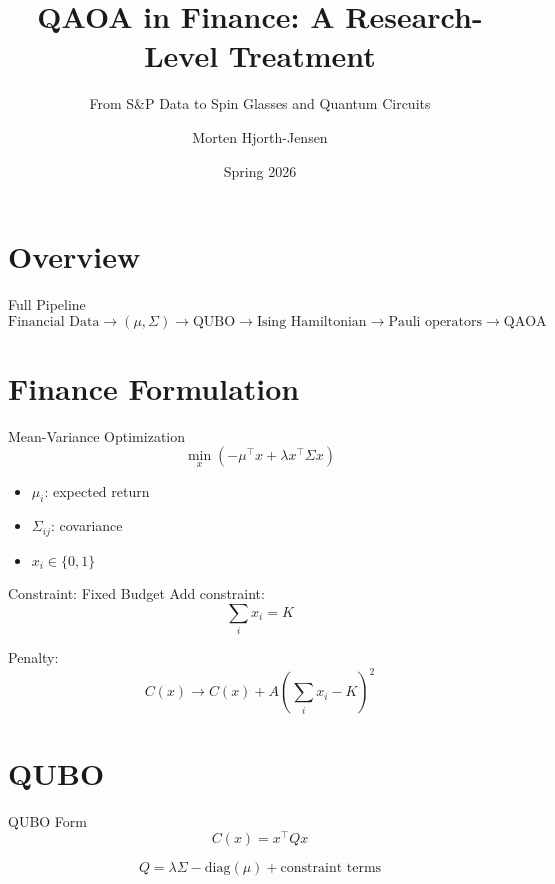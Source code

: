 \documentclass[aspectratio=169]{beamer}
\title{QAOA in Finance: A Research-Level Treatment}
\subtitle{From S\&P Data to Spin Glasses and Quantum Circuits}
\author{Morten Hjorth-Jensen}
\date{Spring 2026}
\begin{document}
\frame{\titlepage}

\section{Overview}

\begin{frame}{Full Pipeline}
\[
\text{Financial Data}
\rightarrow (\mu,\Sigma)
\rightarrow \text{QUBO}
\rightarrow \text{Ising Hamiltonian}
\rightarrow \text{Pauli operators}
\rightarrow \text{QAOA}
\]
\end{frame}

\section{Finance Formulation}

\begin{frame}{Mean-Variance Optimization}
\[
\min_x \left( -\mu^\top x + \lambda x^\top \Sigma x \right)
\]

\begin{itemize}
\item $\mu_i$: expected return
\item $\Sigma_{ij}$: covariance
\item $x_i \in \{0,1\}$
\end{itemize}
\end{frame}

\begin{frame}{Constraint: Fixed Budget}
Add constraint:
\[
\sum_i x_i = K
\]

Penalty:
\[
C(x) \rightarrow C(x) + A\left(\sum_i x_i - K\right)^2
\]
\end{frame}

\section{QUBO}

\begin{frame}{QUBO Form}
\[
C(x) = x^\top Q x
\]

\[
Q = \lambda \Sigma - \text{diag}(\mu) + \text{constraint terms}
\]
\end{frame}

\end{document}
